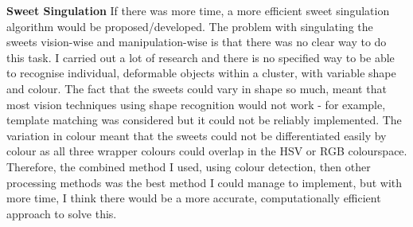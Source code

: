 \textbf{Sweet Singulation}\newline
If there was more time, a more efficient sweet singulation algorithm would be proposed/developed. The problem with singulating the sweets vision-wise and manipulation-wise is that there was no clear way to do this task. I carried out a lot of research and there is no specified way to be able to recognise individual, deformable objects within a cluster, with variable shape and colour. The fact that the sweets could vary in shape so much, meant that most vision techniques using shape recognition would not work - for example, template matching was considered but it could not be reliably implemented. The variation in colour meant that the sweets could not be differentiated easily by colour as all three wrapper colours could overlap in the HSV or RGB colourspace. Therefore, the combined method I used, using colour detection, then other processing methods was the best method I could manage to implement, but with more time, I think there would be a more accurate, computationally efficient approach to solve this.
